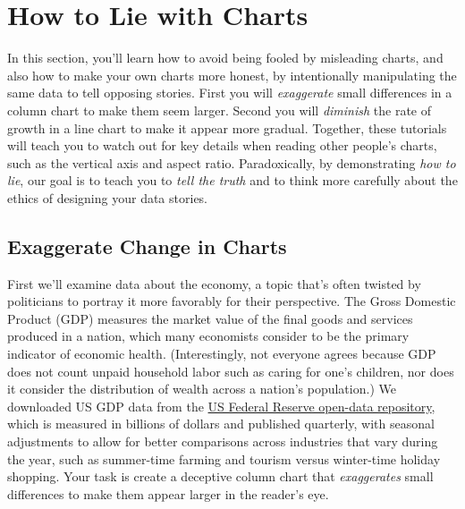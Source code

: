 \documentclass[
  english,
]{book}
\begin{document}
\hypertarget{how-to-lie-with-charts}{%
\section*{How to Lie with Charts}\label{how-to-lie-with-charts}}

In this section, you'll learn how to avoid being fooled by misleading charts, and also how to make your own charts more honest, by intentionally manipulating the same data to tell opposing stories. First you will \emph{exaggerate} small differences in a column chart to make them seem larger. Second you will \emph{diminish} the rate of growth in a line chart to make it appear more gradual. Together, these tutorials will teach you to watch out for key details when reading other people's charts, such as the vertical axis and aspect ratio. Paradoxically, by demonstrating \emph{how to lie}, our goal is to teach you to \emph{tell the truth} and to think more carefully about the ethics of designing your data stories.

\hypertarget{exaggerate-change-in-charts}{%
\subsection*{Exaggerate Change in Charts}\label{exaggerate-change-in-charts}}

First we'll examine data about the economy, a topic that's often twisted by politicians to portray it more favorably for their perspective. The Gross Domestic Product (GDP) measures the market value of the final goods and services produced in a nation, which many economists consider to be the primary indicator of economic health. (Interestingly, not everyone agrees because GDP does not count unpaid household labor such as caring for one's children, nor does it consider the distribution of wealth across a nation's population.) We downloaded US GDP data from the \href{https://fred.stlouisfed.org/series/GDP}{US Federal Reserve open-data repository}, which is measured in billions of dollars and published quarterly, with seasonal adjustments to allow for better comparisons across industries that vary during the year, such as summer-time farming and tourism versus winter-time holiday shopping. Your task is create a deceptive column chart that \emph{exaggerates} small differences to make them appear larger in the reader's eye.
\end{document}
